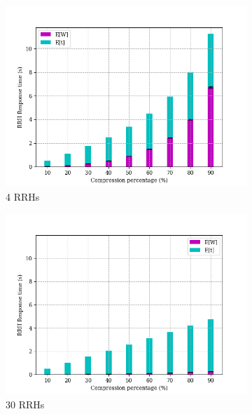 \documentclass[11pt,a4paper,oneside, openright]{article}
\begin{document}
\begin{figure}[h]
\centering
\begin{subfigure}{.5\textwidth}
  \centering
  \includegraphics[width=\linewidth]{images/response-time-rrh-ratio-4}
  \caption{4 RRHs}
  \label{fig:response-time-rrh-ratio-4}
\end{subfigure}%
\begin{subfigure}{.5\textwidth}
  \centering
  \includegraphics[width=\linewidth]{images/response-time-rrh-ratio-30}
  \caption{30 RRHs}
  \label{fig:response-time-rrh-ratio-30}
\end{subfigure}
\caption{}
\label{fig:response-time-rrh-ratio}
\end{figure}
\end{document}
